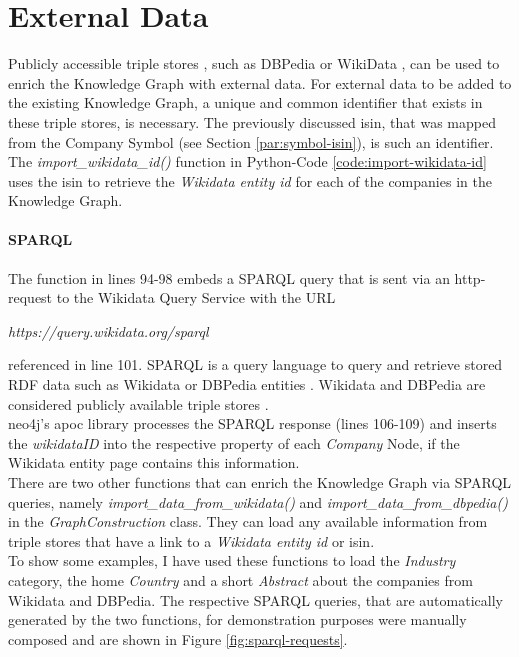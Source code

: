 \section{External Data}
Publicly accessible triple stores \cite{triple-store}, such as DBPedia \cite{dbpedia} or WikiData \cite{wikidata}, can be used to enrich the Knowledge Graph with external data.
For external data to be added to the existing Knowledge Graph, a unique and common identifier that exists in these triple stores, is necessary.
The previously discussed \gls{isin}, that was mapped from the Company Symbol (see Section \ref{par:symbol-isin}), is such an identifier.
The \emph{import\_wikidata\_id()} function in Python-Code \ref{code:import-wikidata-id} uses the \gls{isin} to retrieve the \emph{Wikidata entity id} \cite{wiki-entity-id} for each of the companies in the Knowledge Graph.


\paragraph{SPARQL}
The function in lines 94-98 embeds a SPARQL \cite{sparql} query that is sent via an http-request to the Wikidata Query Service with the URL
\begin{center}
\emph{https://query.wikidata.org/sparql}
\end{center}
referenced in line 101.
SPARQL is a query language to query and retrieve stored RDF data such as Wikidata or DBPedia entities \cite{sparql}.
Wikidata and DBPedia are considered publicly available triple stores \cite{triple-store}.\\
neo4j's apoc \cite{neo4j-apoc} library processes the SPARQL response (lines 106-109) and inserts the \emph{wikidataID} into the respective property of each \emph{Company} Node, if the Wikidata entity page contains this information.\\

There are two other functions that can enrich the Knowledge Graph via SPARQL queries, namely
\emph{import\_data\_from\_wikidata()} and \emph{import\_data\_from\_dbpedia()}
in the \emph{GraphConstruction} class.
They can load any available information from triple stores that have a link to a \emph{Wikidata entity id} \cite{wiki-entity-id} or \gls{isin}.\\
To show some examples, I have used these functions to load the \emph{Industry} category, the home \emph{Country} and a short \emph{Abstract} about the companies
from Wikidata and DBPedia.
The respective SPARQL queries, that are automatically generated by the two functions, for demonstration purposes were manually composed and are shown in Figure \ref{fig:sparql-requests}.

